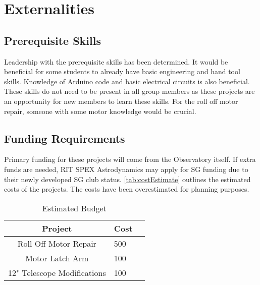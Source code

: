 \documentclass[conference]{IEEEtran} %
\begin{document}
\section{Externalities}
\subsection{Prerequisite Skills}
  Leadership with the prerequisite skills has been determined.
  It would be beneficial for some students to already have basic engineering and hand tool skills.
  Knowledge of Arduino code and basic electrical circuits is also beneficial.
  These skills do not need to be present in all group members as these projects are an opportunity for new members to learn these skills.
  For the roll off motor repair, someone with some motor knowledge would be crucial.

\subsection{Funding Requirements}
  Primary funding for these projects will come from the Observatory itself.
  If extra funds are needed, RIT SPEX Astrodynamics may apply for SG funding due to their newly developed SG club status.
  \autoref{tab:costEstimate} outlines the estimated costs of the projects.
  The costs have been overestimated for planning purposes.

  \begin{table}[hb!]
        \caption{Estimated Budget}
        \centering
        \begin{tabular}{@{}cll@{}}
            \toprule %
            Project & Cost \\
            \midrule %
            Roll Off Motor Repair & 500 \\
            Motor Latch Arm & 100 \\
            12" Telescope Modifications & 100 \\
            \bottomrule
        \end{tabular}
    \label{tab:costEstimate}
    \end{table}
\end{document}

